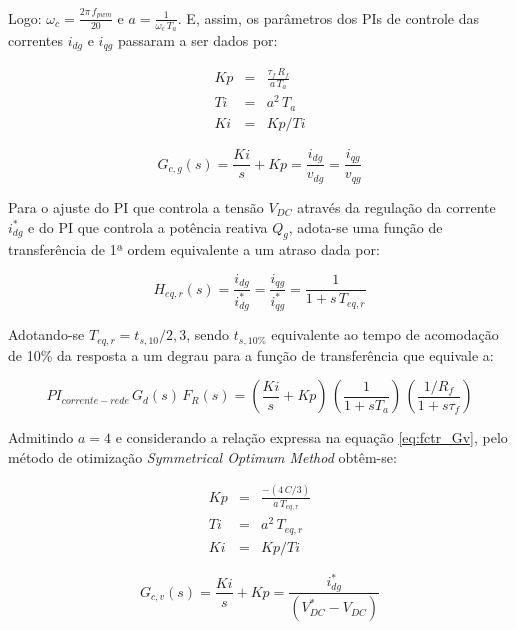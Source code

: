 Logo: $\omega_c = \frac{2\pi\,f_{pwm}}{20}$ e $a = \frac{1}{\omega_c\,T_a}$.
E, assim, os parâmetros dos PIs de controle das correntes $i_{dg}$ e $i_{qg}$ passaram a ser dados por:

\begin{eqnarray}
  Kp &=& \frac{\tau_f\,R_f}{a\,T_a}
  \\
  Ti &=& a^2\,T_a
  \\
  Ki &=& Kp/Ti
\end{eqnarray}

\begin{equation}
\label{eq:PI_Corr_Grid}
  G_{c,g}(s) = \frac{Ki}{s} + Kp = \frac{i_{dg}}{v_{dg}} = \frac{i_{qg}}{v_{qg}}
\end{equation}



Para o ajuste do PI que controla a tensão $V_{DC}$ através da regulação da corrente $i_{dg}^*$ e do PI que controla a potência reativa $Q_g$, adota-se uma função de transferência de 1ª ordem equivalente a um atraso dada por:

\begin{equation}
\label{eq:funcao_cor_corref}
  H_{eq,r}(s) = \frac{i_{dg}}{i_{dg}^*} = \frac{i_{qg}}{i_{qg}^*} = \frac{1}{1 + s\,T_{eq,r}}
\end{equation}

Adotando-se $T_{eq,r} = t_{s,10}/2,3$, sendo $t_{s,10\%}$ equivalente ao tempo de acomodação de 10\% da resposta a um degrau para a função de transferência que equivale a:

\begin{equation}
\label{eq:tf_cl_inner}
  PI_{corrente-rede}\,G_{d}(s)\,F_R(s) = \left( \frac{Ki}{s} + Kp \right)\,\left(\frac{1}{1 + sT_a} \right)\,\left(\frac{1/R_f}{1 + s\tau_f}\right)
\end{equation}

Admitindo $a = 4$ e considerando a relação expressa na equação \ref{eq:fctr_Gv}, pelo método de otimização \textit{Symmetrical Optimum Method} obtêm-se:

\begin{eqnarray}
  Kp &=& \frac{-(4\,C/3)}{a\,T_{eq,r}}
  \\
  Ti &=& a^2\,T_{eq,r}
  \\
  Ki &=& Kp/Ti
\end{eqnarray}

\begin{equation}
\label{eq:PI_Vdc}
  G_{c,v}(s) = \frac{Ki}{s} + Kp = \frac{i_{dg}^*}{(V_{DC}^*-V_{DC})}
\end{equation}



